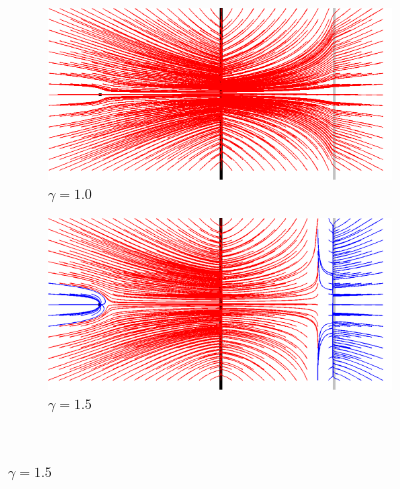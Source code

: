 \begin{figure}[!h]
   \begin{subfigure}[c]{.5\linewidth}
     \centering
     \includegraphics[scale=0.35]{Chapters/Images/m1_gamma_10.png}
     \caption{$\gamma=1.0$}
   \end{subfigure}
   \begin{subfigure}[c]{.5\linewidth}
     \centering
     \includegraphics[scale=0.35]{Chapters/Images/m1_gamma_15.png}
     \caption{$\gamma=1.5$}
   \end{subfigure}\\
   

\end{figure}
